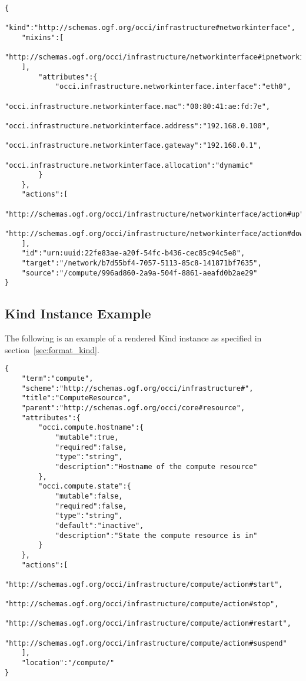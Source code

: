 \documentclass[10pt,a4paper]{article}
\begin{document}
\begin{appendices}
\begin{lstlisting}
{
    "kind":"http://schemas.ogf.org/occi/infrastructure#networkinterface",
    "mixins":[
        "http://schemas.ogf.org/occi/infrastructure/networkinterface#ipnetworkinterface"
    ],
        "attributes":{
            "occi.infrastructure.networkinterface.interface":"eth0",
            "occi.infrastructure.networkinterface.mac":"00:80:41:ae:fd:7e",
            "occi.infrastructure.networkinterface.address":"192.168.0.100",
            "occi.infrastructure.networkinterface.gateway":"192.168.0.1",
            "occi.infrastructure.networkinterface.allocation":"dynamic"
        }
    },
    "actions":[
        "http://schemas.ogf.org/occi/infrastructure/networkinterface/action#up"
        "http://schemas.ogf.org/occi/infrastructure/networkinterface/action#down"
    ],
    "id":"urn:uuid:22fe83ae-a20f-54fc-b436-cec85c94c5e8",
    "target":"/network/b7d55bf4-7057-5113-85c8-141871bf7635",
    "source":"/compute/996ad860-2a9a-504f-8861-aeafd0b2ae29"
}
\end{lstlisting}

\subsection{Kind Instance Example}
\label{kind_instance_rendering_example}

The following is an example of a rendered Kind instance as specified in section~\ref{sec:format_kind}.

\begin{lstlisting}
{
    "term":"compute",
    "scheme":"http://schemas.ogf.org/occi/infrastructure#",
    "title":"ComputeResource",
    "parent":"http://schemas.ogf.org/occi/core#resource",
    "attributes":{
        "occi.compute.hostname":{
            "mutable":true,
            "required":false,
            "type":"string",
            "description":"Hostname of the compute resource"
        },
        "occi.compute.state":{
            "mutable":false,
            "required":false,
            "type":"string",
            "default":"inactive",
            "description":"State the compute resource is in"
        }
    },
    "actions":[
        "http://schemas.ogf.org/occi/infrastructure/compute/action#start",
        "http://schemas.ogf.org/occi/infrastructure/compute/action#stop",
        "http://schemas.ogf.org/occi/infrastructure/compute/action#restart",
        "http://schemas.ogf.org/occi/infrastructure/compute/action#suspend"
    ],
    "location":"/compute/"
}
\end{lstlisting}


\end{appendices}
\end{document}
